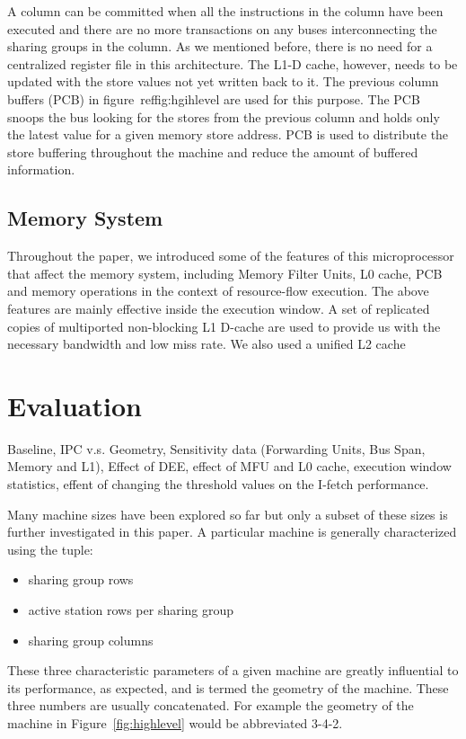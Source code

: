\documentclass[10pt,twocolumn]{IEEEtran}
\begin{document}
A column can be committed when all the instructions in the column have
been executed and there are no more transactions on any buses
interconnecting the sharing groups in the column.  As we mentioned
before, there is no need for a centralized register file in this
architecture.  The L1-D cache, however, needs to be updated with the
store values not yet written back to it.  The previous column buffers
(PCB) in figure~ref{fig:hgihlevel} are used  for this purpose.  The PCB
snoops the bus looking for the stores from the previous column and
holds only the latest value for a given memory store address.  PCB is
used to distribute the store buffering throughout the machine and
reduce the amount of buffered information.

\subsection {Memory System}

Throughout the paper, we introduced some of the features of this
microprocessor that affect the memory system, including Memory Filter
Units, L0 cache, PCB and memory operations in the context of
resource-flow execution.  The above features are mainly effective
inside the execution window.  A set of replicated copies of multiported
non-blocking L1 D-cache are used to provide us with the necessary
bandwidth and low miss rate.  We also used a unified L2 cache

\section {Evaluation}

Baseline, IPC v.s. Geometry, Sensitivity data (Forwarding Units, Bus
Span, Memory and L1), Effect of DEE, effect of MFU and L0 cache,
execution window statistics, effent of changing the threshold values on
the I-fetch performance.

Many machine sizes have been explored so far but only a subset of these
sizes is further investigated in this paper. A particular machine is
generally characterized using the tuple:

\begin{itemize}
\item sharing group rows
\item active station rows per sharing group
\item sharing group columns
\end{itemize}

These three characteristic parameters of a given machine are greatly
influential to its performance, as expected, and is termed the geometry
of the machine. These three numbers are usually concatenated.  For
example the geometry of the machine in Figure~\ref{fig:highlevel}
 would be abbreviated 3-4-2.
\end{document}

